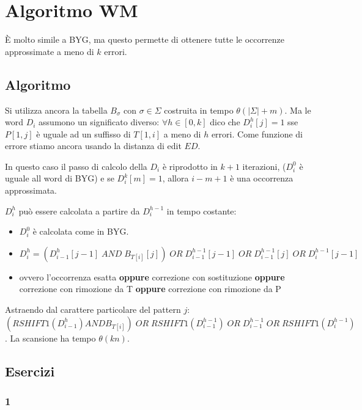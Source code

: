 \chapter{Algoritmo WM}

\`E molto simile a BYG, ma questo permette di ottenere tutte le occorrenze approssimate a meno di $k$ errori.

\section{Algoritmo}

Si utilizza ancora la tabella $B_{\sigma}$ con $\sigma \in \Sigma$ costruita in tempo $\theta(|\Sigma|+m)$. Ma le word $D_i$ assumono un significato diverso: $\forall h \in [0, k]$ dico che $D^h_i[j] = 1$ sse $P[1,j]$ \`e uguale ad un suffisso di $T[1,i]$ a meno di $h$ errori. Come funzione di errore stiamo ancora usando la distanza di edit $ED$.

In questo caso il passo di calcolo della $D_i$ \`e riprodotto in $k+1$ iterazioni, ($D^0_i$ \`e uguale all word di BYG) e se $D^k_i[m] = 1$, allora $i-m+1$ \`e una occorrenza approssimata.

$D^h_i$ pu\`o essere calcolata a partire da $D^{h-1}_i$ in tempo costante:

\begin{itemize}
  \item $D^0_i$ \`e calcolata come in BYG.
  \item $D^h_i = (D^h_{i-1}[j-1] \; AND \; B_{T[i]}[j]) \; OR \; D^{h-1}_{i-1}[j-1] \; OR \; D^{h-1}_{i-1}[j] \; OR \; D^{h-1}_{i}[j-1]$
  \item ovvero l'occorrenza esatta \textbf{oppure} correzione con sostituzione \textbf{oppure} correzione con rimozione da T \textbf{oppure} correzione con rimozione da P
\end{itemize}

Astraendo dal carattere particolare del pattern $j$: $(RSHIFT1(D^h_{i-1}) AND B_{T[i]}) \; OR \; RSHIFT1(D^{h-1}_{i-1}) \; OR \; D^{h-1}_{i-1} \; OR \; RSHIFT1(D^{h-1}_i)$.
La scansione ha tempo $\theta(kn)$.

\section{Esercizi}

\subsection{1}

